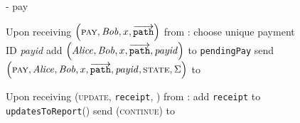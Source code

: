   \begin{figure}[H]
    \begin{systembox}{\fpaynet - pay}
      \begin{algorithmic}[1]
        \State Upon receiving $\left(\textsc{pay}, \mathit{Bob}, x,
        \overrightarrow{\mathtt{path}}\right)$ from \alice:
        \Indent
          \State choose unique payment ID \textit{payid}
          \State add $\left(\mathit{Alice}, \mathit{Bob}, x, \overrightarrow{\mathtt{path}},
          \mathit{payid}\right)$ to \texttt{pendingPay}
          \State send $\left(\textsc{pay}, \mathit{Alice}, \mathit{Bob}, x,
          \overrightarrow{\mathtt{path}}, \mathit{payid}, \textsc{state},
          \Sigma\right)$ to \simulator
          \label{alg:fpaynet:pay:send}
        \EndIndent
        \Statex

        \State Upon receiving (\textsc{update}, \texttt{receipt}, \alice) from
        \simulator:
        \Indent
          \State add \texttt{receipt} to \texttt{updatesToReport}(\alice)
          \State send (\textsc{continue}) to \simulator
        \EndIndent
      \end{algorithmic}
    \end{systembox}
    \caption{}
    \label{alg:fpaynet:pay}
  \end{figure}


